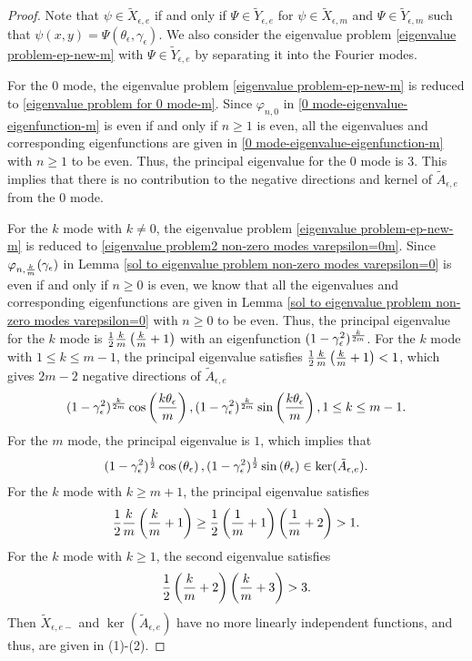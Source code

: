 \documentclass[1 [leqno, 11pt]{amsart}
\numberwithin{equation}{section}
\let\ep=\epsilon
\begin{document}
\begin{CJK*}{GBK}{song}
\begin{proof}
Note that $\psi\in\tilde{X}_{\ep,e}$ if and only if $\Psi\in\tilde{Y}_{\ep,e}$ for $\psi \in \tilde{X}_{\ep,m}$ and $\Psi \in \tilde{Y}_{\ep,m}$ such that $\psi(x,y) = \Psi(\theta_\ep, \gamma_\ep)$.  We also consider the eigenvalue problem \eqref{eigenvalue problem-ep-new-m} with $\Psi \in \tilde{Y}_{\ep,e}$ by separating it into the Fourier modes.

For the $0$ mode, the eigenvalue problem \eqref{eigenvalue problem-ep-new-m} is reduced to \eqref{eigenvalue problem for 0 mode-m}. Since $\varphi_{n,0}$ in \eqref{0 mode-eigenvalue-eigenfunction-m} is even if and only if $n\geq1$ is even, all the eigenvalues and corresponding eigenfunctions   are given in \eqref{0 mode-eigenvalue-eigenfunction-m} with $n\geq1$ to be even. Thus, the principal eigenvalue  for the $0$ mode is $3$. This implies that
 there is no contribution to the negative directions and kernel of $ \tilde A_{\ep,e} $ from the $0$ mode.

For the $k$ mode with $k\neq0$, the eigenvalue problem \eqref{eigenvalue problem-ep-new-m} is reduced to \eqref{eigenvalue problem2 non-zero modes varepsilon=0m}. Since $\varphi_{n,{k\over m}}(\gamma_\ep)$ in Lemma \ref{sol to eigenvalue problem non-zero modes varepsilon=0} is even if and only if $n\geq0$ is even, we know that
all the eigenvalues and corresponding  eigenfunctions are given in Lemma  \ref{sol to eigenvalue problem non-zero modes varepsilon=0}  with $n\geq0$ to be even. Thus, the principal eigenvalue  for the $k$ mode is ${1\over2}{k\over m}\left({k\over m}+1 \right)$ with an eigenfunction $(1-\gamma_\ep^2)^{k\over 2m}$.
 For the $k$ mode  with $1\leq k\leq m-1$, the principal eigenvalue satisfies ${1\over2}{k\over m}\left({k\over m}+1 \right)<1$, which gives $2m-2$
 negative directions of $ \tilde A_{\ep,e} $
\begin{align*} (1-\gamma_\ep^2)^{k\over 2m}\cos\left({k\theta_\ep\over m}\right),(1-\gamma_\ep^2)^{k\over 2m}\sin\left({k\theta_\ep\over m}\right), 1\leq k\leq m-1.
 \end{align*}
 For the $m$ mode, the principal eigenvalue is $1$, which implies that
 \begin{align*}(1-\gamma_\ep^2)^{1\over 2}\cos\left({\theta_\ep}\right),(1-\gamma_\ep^2)^{1\over 2}\sin\left({\theta_\ep}\right) \in \ker (\tilde A_{\ep,e}).\end{align*}
 For the $k$ mode  with $k\geq m+1$, the principal eigenvalue satisfies
 \begin{align}\label{k-m+1-pr}
 {1\over2}{k\over m}\left({k\over m}+1 \right)\geq{1\over2}\left({1\over m}+1\right)\left({1\over m}+2 \right)>1.
 \end{align}
  For the $k$ mode  with $k\geq 1$, the second eigenvalue satisfies
    \begin{align}\label{k-1-se}
 {1\over2}\left({k\over m}+2\right)\left({k\over m} +3\right)>3.
 \end{align}
Then $\tilde X_{\ep,e-}$ and $\ker (\tilde A_{\ep,e})$ have no more linearly independent functions, and thus, are given in (1)-(2).





\end{proof}
\end{CJK*}
\end{document}
